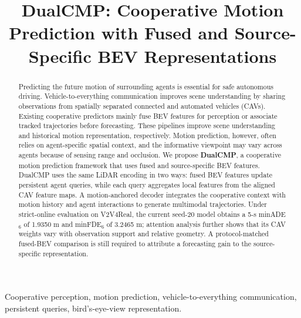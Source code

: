 \documentclass[lettersize,journal]{IEEEtran}
\begin{document}
\title{DualCMP: Cooperative Motion Prediction with Fused and Source-Specific BEV Representations}

\author{}

\maketitle

\begin{abstract}
Predicting the future motion of surrounding agents is essential for safe autonomous driving. Vehicle-to-everything communication improves scene understanding by sharing observations from spatially separated connected and automated vehicles (CAVs). Existing cooperative predictors mainly fuse BEV features for perception or associate tracked trajectories before forecasting. These pipelines improve scene understanding and historical motion representation, respectively. Motion prediction, however, often relies on agent-specific spatial context, and the informative viewpoint may vary across agents because of sensing range and occlusion. We propose \textbf{DualCMP}, a cooperative motion prediction framework that uses fused and source-specific BEV features. DualCMP uses the same LiDAR encoding in two ways: fused BEV features update persistent agent queries, while each query aggregates local features from the aligned CAV feature maps. A motion-anchored decoder integrates the cooperative context with motion history and agent interactions to generate multimodal trajectories. Under strict-online evaluation on V2V4Real, the current seed-20 model obtains a 5-s minADE$_6$ of 1.9350 m and minFDE$_6$ of 3.2465 m; attention analysis further shows that its CAV weights vary with observation support and relative geometry. A protocol-matched fused-BEV comparison is still required to attribute a forecasting gain to the source-specific representation.
\end{abstract}

\begin{IEEEkeywords}
Cooperative perception, motion prediction, vehicle-to-everything communication, persistent queries, bird's-eye-view representation.
\end{IEEEkeywords}
\end{document}
